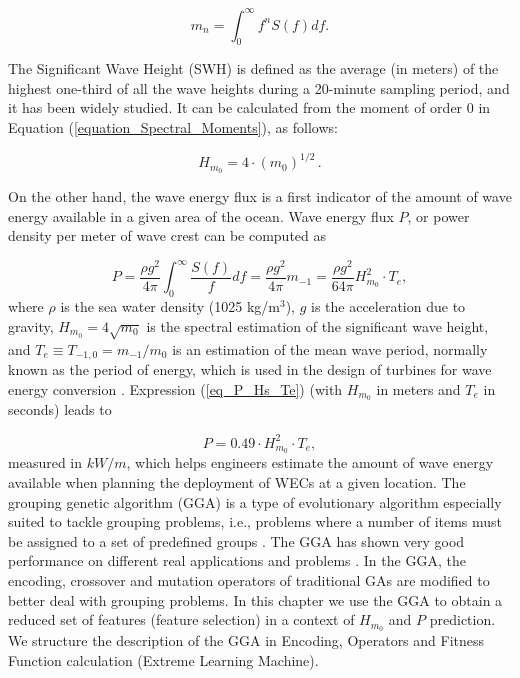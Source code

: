 \begin{equation}\label{equation_Spectral_Moments}
 m_n = \int_{0} ^{\infty} f^n S(f) df.
\end{equation}

The Significant Wave Height (SWH) is defined as the average (in meters) of the highest one-third of all the wave heights during a 20-minute sampling period, and it has been widely studied.
It can be calculated from the moment of order $0$ in Equation (\ref{equation_Spectral_Moments}), as follows:

\begin{equation}
H_{m_0} = 4 \cdot (m_0)^{1/2}\,.
\end{equation}

On the other hand, the wave energy flux is a first indicator of the amount of wave energy available in a given area of the ocean. Wave energy flux $P$, or power density per meter of wave crest can be computed as

\begin{equation} \label{eq_P_Hs_Te}
 P =  \frac{\rho g^2}{4 \pi}\int_{0}^{\infty}\frac{S(f)}{f}  df  =   \frac{\rho g^2}{4 \pi}   m_{-1} =   \frac{\rho g^2}{64 \pi}   H_{m_0}^2  \cdot T_e,
\end{equation}
where $\rho$ is the sea water density (1025 kg/m$^3$), $g$ is the acceleration due to gravity, $H_{m_0} = 4  \sqrt{m_0}$ is the spectral estimation of the significant wave height, and $T_e \equiv T_{-1,0} = m_{-1} / m_0$ is an estimation of the mean wave period, normally known as the period of energy, which is used in the design of turbines for wave energy conversion \citep{cahill2013wave}. Expression (\ref{eq_P_Hs_Te}) (with $H_{m_0}$ in meters and $T_e$ in seconds) leads to

\begin{equation}
P =  0.49 \cdot   H_{m_0}^2 \cdot T_e,
\end{equation}
measured in $kW/m$, which helps engineers estimate the amount of wave energy available when planning the deployment of WECs at a given location.
The grouping genetic algorithm (GGA) is a type of evolutionary algorithm especially suited to tackle grouping problems, i.e., problems where a number of items must be assigned to a set of predefined groups \citep{falkenauer1993grouping,falkenauer1998genetic}. The GGA has shown very good performance on different real applications and problems \citep{agustin2011near,agustin2009hybrid,brown2005evaluating,james2007hybrid,james2007hybridb,de2000grouping}. In the GGA, the encoding, crossover and mutation operators of traditional GAs are modified to better deal with grouping problems. In this chapter we use the GGA to obtain a reduced set of features (feature selection) in a context of $H_{m_0}$ and $P$ prediction. We structure the description of the GGA in Encoding, Operators and Fitness Function calculation (Extreme Learning Machine).

